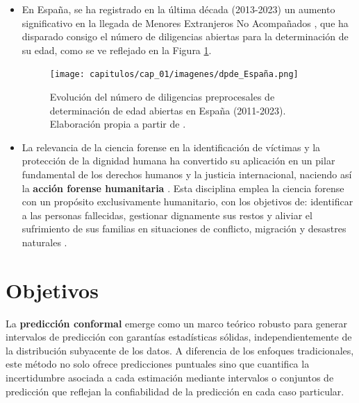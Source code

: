 \begin{itemize}
    \item En España, se ha registrado en la última década (2013-2023) un aumento significativo en la llegada de Menores Extranjeros No Acompañados \cite{fge2024,fge2019,fge2016,fge2013}, que ha disparado consigo el número de diligencias abiertas para la determinación de su edad, como se ve reflejado en la Figura \ref{fig:evolucion_DPDE}.

    \begin{figure}[h]
        \centering
        \texttt{[image: capitulos/cap\_01/imagenes/dpde\_España.png]}
        \caption[
            Evolución del número de diligencias preprocesales de determinación de edad abiertas en España (2011-2023).
        ]{
            Evolución del número de diligencias preprocesales de determinación de edad abiertas en España (2011-2023). Elaboración propia a partir de \cite{fge2013,fge2016,fge2019, fge2024}.
        } 
        \label{fig:evolucion_DPDE}
    \end{figure}

    \item La relevancia de la ciencia forense en la identificación de víctimas y la protección de la dignidad humana ha convertido su aplicación en un pilar fundamental de los derechos humanos y la justicia internacional, naciendo así la  \textbf{acción forense humanitaria} \cite{cordner2017}. Esta disciplina emplea la ciencia forense con un propósito exclusivamente humanitario, con los objetivos de: identificar a las personas fallecidas, gestionar dignamente sus restos y aliviar el sufrimiento de sus familias en situaciones de conflicto, migración y desastres naturales \cite{tidballbinz2021}. 

\end{itemize}


\section{Objetivos}

La \textbf{predicción conformal} emerge como un marco teórico robusto para generar intervalos de predicción con garantías estadísticas sólidas, independientemente de la distribución subyacente de los datos. A diferencia de los enfoques tradicionales, este método no solo ofrece predicciones puntuales sino que cuantifica la incertidumbre asociada a cada estimación mediante intervalos o conjuntos de predicción que reflejan la confiabilidad de la predicción en cada caso particular.

